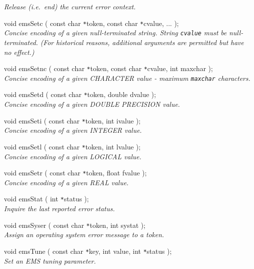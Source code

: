 \documentclass[twoside,11pt]{article}
\renewcommand{\_}{\texttt{\symbol{95}}}
\newcommand{\listline}{\hspace{1pt}\\}
\newcommand{\listline}{}
\begin{document}
\begin {description}
\textit{Release (i.e.\ end) the current error context.}
\item[void emsSetc ( const char \texttt{*}token,
const char \texttt{*}cvalue, ... );] \listline
\textit{Concise encoding of a given null-terminated string. String 
\texttt{cvalue} must be null-terminated. (For historical
reasons, additional arguments are permitted but have no effect.)}
\item[void emsSetnc ( const char \texttt{*}token, const char \texttt{*}cvalue,
int maxchar );] \listline
\textit{Concise encoding of a given CHARACTER value - maximum \texttt{maxchar}
characters.}
\item[void emsSetd ( const char \texttt{*}token, double dvalue );] \listline
\textit{Concise encoding of a given DOUBLE PRECISION value.}
\item[void emsSeti ( const char \texttt{*}token, int ivalue );] \listline
\textit{Concise encoding of a given INTEGER value.}
\item[void emsSetl ( const char \texttt{*}token, int lvalue );] \listline
\textit{Concise encoding of a given LOGICAL value.}
\item[void emsSetr ( const char \texttt{*}token, float fvalue );] \listline
\textit{Concise encoding of a given REAL value.}
\item[void emsStat ( int \texttt{*}status );] \listline
\textit{Inquire the last reported error status.}
\item[void emsSyser ( const char \texttt{*}token, int systat );] \listline
\textit{Assign an operating system error message to a token.}
\item[void emsTune ( const char \texttt{*}key, int value,
int \texttt{*}status );] \listline
\textit{Set an EMS tuning parameter.}
\end {description}

\newpage
\end{document}
